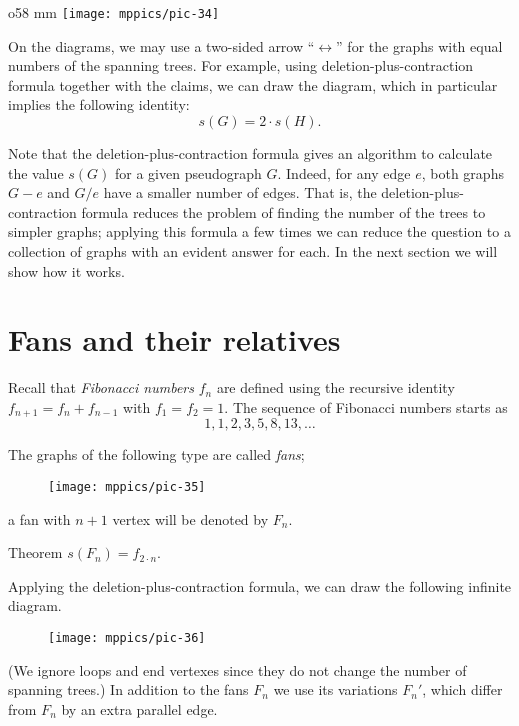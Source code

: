 \begin{wrapfigure}{o}{58 mm}
\vskip-0mm
\centering
\texttt{[image: mppics/pic-34]}
\vskip-0mm
\end{wrapfigure}

On the diagrams, we may use a two-sided arrow ``$\leftrightarrow$'' for the graphs with equal numbers of the spanning trees.
For example, using deletion-plus-contraction formula together with the claims, we can draw the diagram, which in particular implies the following identity:
\[s(G)=2\cdot s(H).\]

Note that the deletion-plus-contraction formula gives an algorithm to calculate  the value $s(G)$ for a given pseudograph $G$.
Indeed, for any edge $e$, both graphs $G- e$ and $G/e$ have a smaller number of edges.
That is, the deletion-plus-contraction formula reduces the problem of finding the number of the trees to simpler graphs;
applying this formula a few times we can reduce the question to a collection of graphs with an evident answer for each.
In the next section we will show how it works.


 
\section*{Fans and their relatives}



Recall that \emph{Fibonacci numbers} $f_n$ are defined using the recursive identity 
$f_{n+1}=f_n+f_{n-1}$
with $f_1=f_2=1$.
The sequence of Fibonacci numbers starts as
\[1,1,2,3,5,8,13,\dots\]

The graphs of the following type are called \label{page:fan}\emph{fans}; 
\begin{figure}[h!]
\centering
\texttt{[image: mppics/pic-35]}
\end{figure}
a fan with $n+1$ vertex will be denoted by $F_n$. 

\begin{thm}{Theorem}\label{thm:fans}
$s(F_n)=f_{2\cdot n}$.
\end{thm}

Applying the deletion-plus-contraction formula, we can draw the following infinite diagram.
\begin{figure}[h!]
\centering
\texttt{[image: mppics/pic-36]}
\end{figure}
(We ignore loops and end vertexes since they do not change the number of spanning trees.)
In addition to the fans $F_n$ we use its variations $F_n'$, which differ from $F_n$ by an extra parallel edge.

